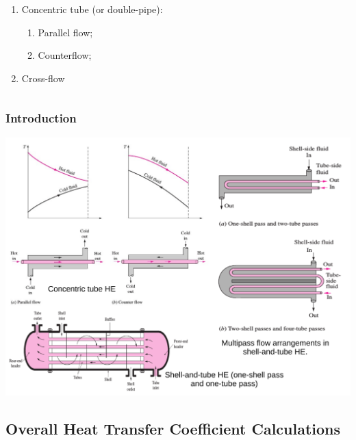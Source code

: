 \documentclass[10pt,compress]{beamer}
\begin{document}
\begin{frame}
\begin{columns}
\begin{column}[l]{0.5\linewidth}
\begin{enumerate}
              \begin{enumerate}\scriptsize
                  \item<3-> Concentric tube (or double-pipe):
                       \begin{enumerate}\scriptsize
                          \item<3-> Parallel flow;
                          \item<3-> Counterflow;
                       \end{enumerate}
                  \item<3-> Cross-flow
              \end{enumerate}
         \end{enumerate}
       \end{column}      
    \end{columns}
\end{frame}


\begin{frame}
  \frametitle{Introduction}
    \begin{center}
         \includegraphics[width=1.\columnwidth,height=0.65\columnwidth,clip]{./Pics/HeatExchangers_Classification2}
    \end{center}
\end{frame}


\subsection{Overall Heat Transfer Coefficient Calculations}
\end{document}
